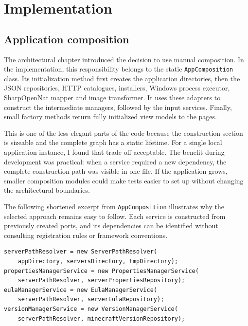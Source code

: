 
\chapter{Implementation}\label{chap:implementation}

\section{Application composition}\label{sec:implementation-composition}

The architectural chapter introduced the decision to use manual composition. In the implementation, this responsibility belongs to the static \texttt{AppComposition} class. Its initialization method first creates the application directories, then the JSON repositories, HTTP catalogues, installers, Windows process executor, SharpOpenNat mapper and image transformer. It uses these adapters to construct the intermediate managers, followed by the input services. Finally, small factory methods return fully initialized view models to the pages.

This is one of the less elegant parts of the code because the construction section is sizeable and the complete graph has a static lifetime. For a single local application instance, I found that trade-off acceptable. The benefit during development was practical: when a service required a new dependency, the complete construction path was visible in one file. If the application grows, smaller composition modules could make tests easier to set up without changing the architectural boundaries.

The following shortened excerpt from \texttt{AppComposition} illustrates why the selected approach remains easy to follow. Each service is constructed from previously created ports, and its dependencies can be identified without consulting registration rules or framework conventions.

\begin{footnotesize}
\begin{verbatim}
serverPathResolver = new ServerPathResolver(
    appDirectory, serversDirectory, tmpDirectory);
propertiesManagerService = new PropertiesManagerService(
    serverPathResolver, serverPropertiesRepository);
eulaManagerService = new EulaManagerService(
    serverPathResolver, serverEulaRepository);
versionManagerService = new VersionManagerService(
    serverPathResolver, minecraftVersionRepository);
\end{verbatim}
\end{footnotesize}

